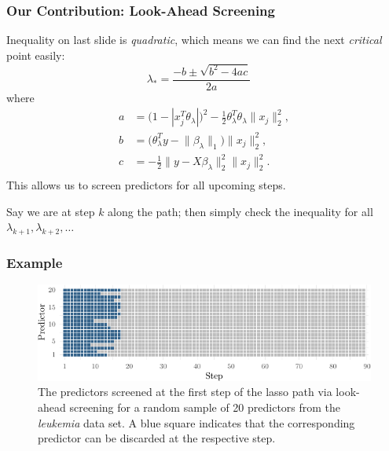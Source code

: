\documentclass[10pt,ignorenonframetext]{beamer}
\begin{document}
\begin{frame}[c]
  \frametitle{Our Contribution: Look-Ahead Screening}
  Inequality on last slide is \emph{quadratic}, which means we can find the next
  \emph{critical} point easily:
  \[
    \lambda_* = \frac{-b \pm \sqrt{b^2 - 4ac}}{2a} \quad
  \]
  where
  \[
    \begin{aligned}
      a & = \big( 1 - | x_j^T \theta_\lambda|\big)^2 -
      \frac 12 \theta_\lambda^T \theta_\lambda \lVert x_j\rVert_2^2,     \\
      b & = \big(\theta_\lambda^T y - \lVert \beta_\lambda \rVert_1\big)
      \lVert x_j \rVert_2^2,                                             \\
      c & = - \frac 12 \lVert y - X\beta_\lambda\rVert_2^2
      \lVert x_j\rVert_2^2.                                              \\
    \end{aligned}
  \]
  This allows us to screen predictors for all upcoming steps.
  \medskip

  \pause

  Say we are at step \(k\) along the path; then simply check the inequality for
  all \(\lambda_{k +1},\lambda_{k + 2}, \dots\)
\end{frame}

\begin{frame}[c]
  \frametitle{Example}

  \begin{figure}
    \centering
    \includegraphics[width=\textwidth]{images/casestudy.pdf}
    \caption{The predictors screened at the first step of the
      lasso path via look-ahead screening for a random sample of
      20 predictors from the \emph{leukemia}
      data set. A blue square indicates that the corresponding predictor can
      be discarded at the respective step.\label{fig:case-study}}
  \end{figure}

\end{frame}
\end{document}
